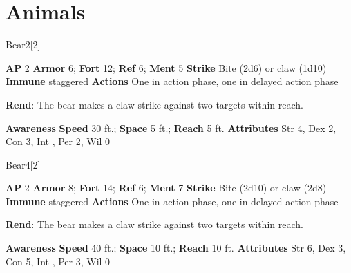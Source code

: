 \section{Animals}
\begin{monsection}[Black]{Bear}{2}[2]
\vspace{-1em}\vspace{-1em}
\begin{spellcontent}
\begin{spelltargetinginfo}
{\textbf{AP} 2}
\pari \textbf{Armor} 6;
\textbf{Fort} 12;
\textbf{Ref} 6;
\textbf{Ment} 5
\pari \textbf{Strike} Bite  (2d6) or claw  (1d10)
\pari \textbf{Immune} staggered
\pari \textbf{Actions} One in action phase, one in delayed action phase
\end{spelltargetinginfo}
\begin{spelleffects}
\pari
\textbf{Rend}:
The bear makes a claw strike against two targets within reach.
\end{spelleffects}
\end{spellcontent}
\begin{spellsubcontent}
\begin{spellfooter}
\pari \textbf{Awareness} 
\pari \textbf{Speed} 30 ft.;
\textbf{Space} 5 ft.;
\textbf{Reach} 5 ft.
\pari \textbf{Attributes}
Str 4,
Dex 2,
Con 3,
Int ,
Per 2,
Wil 0
\end{spellfooter}
\end{spellsubcontent}
\end{monsection}
\begin{monsection}[Brown]{Bear}{4}[2]
\vspace{-1em}\vspace{-1em}
\begin{spellcontent}
\begin{spelltargetinginfo}
{\textbf{AP} 2}
\pari \textbf{Armor} 8;
\textbf{Fort} 14;
\textbf{Ref} 6;
\textbf{Ment} 7
\pari \textbf{Strike} Bite  (2d10) or claw  (2d8)
\pari \textbf{Immune} staggered
\pari \textbf{Actions} One in action phase, one in delayed action phase
\end{spelltargetinginfo}
\begin{spelleffects}
\pari
\textbf{Rend}:
The bear makes a claw strike against two targets within reach.
\end{spelleffects}
\end{spellcontent}
\begin{spellsubcontent}
\begin{spellfooter}
\pari \textbf{Awareness} 
\pari \textbf{Speed} 40 ft.;
\textbf{Space} 10 ft.;
\textbf{Reach} 10 ft.
\pari \textbf{Attributes}
Str 6,
Dex 3,
Con 5,
Int ,
Per 3,
Wil 0
\end{spellfooter}
\end{spellsubcontent}
\end{monsection}
